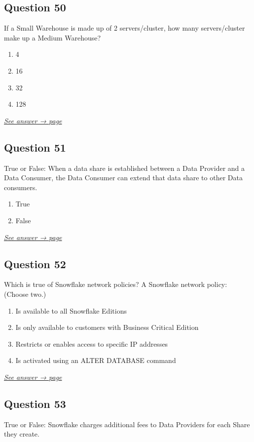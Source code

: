 \documentclass[12pt]{article}
\newcommand{\seeanswer}[1]{%
  \par\smallskip\emph{\hyperref[ans:#1]{See answer → page \pageref{ans:#1}}}%
}
\begin{document}
\subsection*{Question 50}\label{q:50}
If a Small Warehouse is made up of 2 servers/cluster, how many servers/cluster make up a Medium Warehouse?

\begin{enumerate}[label=\Alph*.]
  \item 4
  \item 16
  \item 32
  \item 128
\end{enumerate}
\seeanswer{50}

\subsection*{Question 51}\label{q:51}
True or False: When a data share is established between a Data Provider and a Data Consumer, the Data Consumer can extend that data share to other Data consumers.

\begin{enumerate}[label=\Alph*.]
  \item True
  \item False
\end{enumerate}
\seeanswer{51}

\subsection*{Question 52}\label{q:52}
Which is true of Snowflake network policies? A Snowflake network policy: (Choose two.)

\begin{enumerate}[label=\Alph*.]
  \item Is available to all Snowflake Editions
  \item Is only available to customers with Business Critical Edition
  \item Restricts or enables access to specific IP addresses
  \item Is activated using an ALTER DATABASE command
\end{enumerate}
\seeanswer{52}

\subsection*{Question 53}\label{q:53}
True or False: Snowflake charges additional fees to Data Providers for each Share they create.
\end{document}
